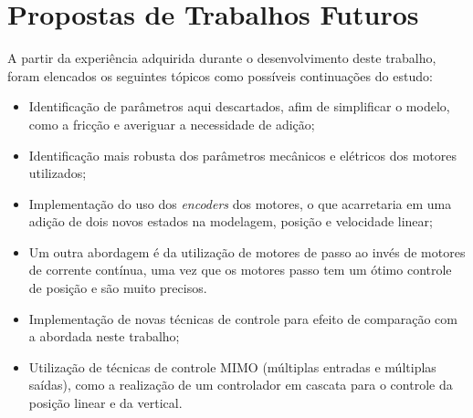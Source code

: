 \section{Propostas de Trabalhos Futuros}

A partir da experiência adquirida durante o desenvolvimento deste trabalho, foram elencados os seguintes tópicos como possíveis continuações do estudo:

\begin{itemize}
    \item Identificação de parâmetros aqui descartados, afim de simplificar o modelo, como a fricção e averiguar a necessidade de adição;
    \item Identificação mais robusta dos parâmetros mecânicos e elétricos dos motores utilizados;
    \item Implementação do uso dos \textit{encoders} dos motores, o que acarretaria em uma adição de dois novos estados na modelagem, posição e velocidade linear;
    \item Um outra abordagem é da utilização de motores de passo ao invés de motores de corrente contínua, uma vez que os motores passo tem um ótimo controle de posição e são muito precisos.
    \item Implementação de novas técnicas de controle para efeito de comparação com a abordada neste trabalho;
    \item Utilização de técnicas de controle MIMO (múltiplas entradas e múltiplas saídas), como a realização de um controlador em cascata para o controle da posição linear e da vertical.

\end{itemize}